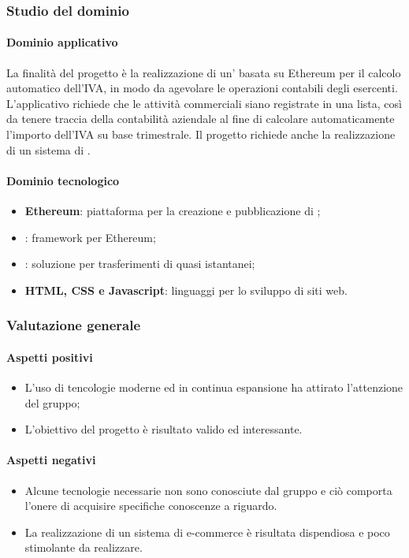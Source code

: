 		\subsubsection{Studio del dominio}
			\paragraph{Dominio applicativo} \Spazio
			La finalità del progetto è la realizzazione di un’ basata su Ethereum per il calcolo automatico dell’IVA, in modo da agevolare le operazioni contabili degli esercenti. L'applicativo richiede che le attività commerciali siano registrate in una lista, così da tenere traccia della contabilità aziendale al fine di calcolare automaticamente l'importo dell'IVA su base trimestrale. Il progetto richiede anche la realizzazione di un sistema di .
			
			
			\paragraph{Dominio tecnologico}
			\begin{itemize}
				\item \textbf{Ethereum}: piattaforma per la creazione e pubblicazione di ;
				\item \textbf{}: framework per Ethereum;
				\item \textbf{}: soluzione per trasferimenti di  quasi istantanei;
				\item \textbf{HTML, CSS e Javascript}: linguaggi per lo sviluppo di siti web.
			\end{itemize}
		\subsubsection{Valutazione generale}
		\paragraph{Aspetti positivi}
		\begin{itemize}
			\item L'uso di tencologie moderne ed in continua espansione ha attirato l'attenzione del gruppo;
			\item L'obiettivo del progetto è risultato valido ed interessante.
		\end{itemize}
		\paragraph{Aspetti negativi}
		\begin{itemize}
			\item Alcune tecnologie necessarie non sono conosciute dal gruppo e ciò comporta l'onere di acquisire specifiche conoscenze a riguardo.
			\item La realizzazione di un sistema di e-commerce è risultata dispendiosa e poco stimolante da realizzare.
		\end{itemize}
